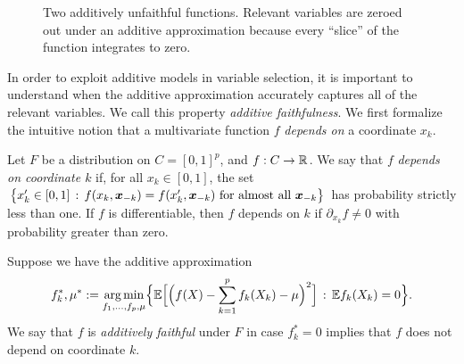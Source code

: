 \begin{figure}[htp]
\vskip-10pt
	\centering
\caption{Two additively unfaithful functions. Relevant variables are
  zeroed out under an additive approximation because every ``slice''
  of the function integrates to zero.}
\vskip-10pt
\end{figure}

In order to exploit additive models in variable selection, it is important to understand when the
additive approximation accurately captures all of the relevant variables.
We call this property \textit{additive faithfulness}. We first formalize the intuitive notion that a multivariate function $f$ \emph{depends on} a coordinate $x_k$.

\begin{definition}
  Let $F$ be a distribution on $C=[0,1]^p$, and $f:C \rightarrow {\mathbb R}$. 
We say that $f$ \textit{depends on coordinate $k$} if, for all $x_k \in [0,1]$, the set 
$\big\{ x'_k \in [0, 1] \,:\, f(x_k, \mbox{\boldmath $x$}_{-k}) = f(x'_k, \mbox{\boldmath $x$}_{-k}) 
\textrm{ for almost all  $\mbox{\boldmath $x$}_{-k}$} \big\}$ 
has probability strictly less than one.
If $f$ is differentiable, then $f$ depends on $k$ if $\partial_{x_k} f \neq 0$ with probability greater than zero.

Suppose we have the additive approximation
\begin{equation}
\label{eqn:unconstrained_additive}
f_k^*, \mu^* := \mathop{\text{\rm arg\,min}}_{f_1,\ldots, f_p, \mu} \Bigl\{ 
             {\mathbb E} \Bigl[\Bigl( f(X) - \sum_{k=1}^p f_k(X_k) -\mu \Bigr)^2 \Bigr]
         \,:\, {\mathbb E} f_k(X_k) = 0 \Bigr\}.
\end{equation}
We say that $f$ is \textit{additively faithful} under $F$ in case
$f^*_k = 0$ implies that $f$ does not depend on coordinate $k$.
\end{definition}

